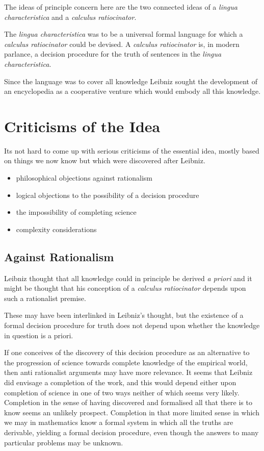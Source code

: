 \documentclass{rbjk}
\begin{document}
\begin{article}
The ideas of principle concern here are the two connected ideas of a {\it lingua characteristica} and a {\it calculus ratiocinator}.

The {\it lingua characteristica} was to be a universal formal language for which a {\it calculus ratiocinator} could be devised.
A {\it calculus ratiocinator} is, in modern parlance, a decision procedure for the truth of sentences in the {\it lingua characteristica}.

Since the language was to cover all knowledge Leibniz sought the development of an encyclopedia as a cooperative venture which would embody all this knowledge.

\section{Criticisms of the Idea}
Its not hard to come up with serious criticisms of the essential idea, mostly based on things we now know but which were discovered after Leibniz.

\begin{itemize}
\item philosophical objections against rationalism
\item logical objections to the possibility of a decision procedure
\item the impossibility of completing science
\item complexity considerations
\end{itemize}

\subsection{Against Rationalism}

Leibniz thought that all knowledge could in principle be derived {\it a priori} and it might be thought that his conception of a {\it calculus ratiocinator} depends upon such a rationalist premise.

These may have been interlinked in Leibniz's thought, but the existence of a formal decision procedure for truth does not depend upon whether the knowledge in question is a priori.

If one conceives of the discovery of this decision procedure as an alternative to the progression of science towards complete knowledge of the empirical world, then anti rationalist arguments may have more relevance.
It seems that Leibniz did envisage a completion of the work, and this would depend either upon completion of science in one of two ways neither of which seems very likely.
Completion in the sense of having discovered and formalised all that there is to know seems an unlikely prospect.
Completion in that more limited sense in which we may in mathematics know a formal system in which all the truths are derivable, yielding a formal decision procedure, even though the answers to many particular problems may be unknown.


\end{article}
\end{document}
